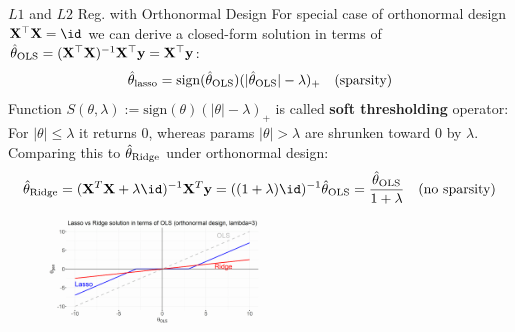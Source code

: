 \documentclass[11pt,compress,t,notes=noshow, xcolor=table]{beamer}
\begin{document}
\begin{vbframe}{$L1$ and $L2$ Reg. with Orthonormal Design}
\small For special case of orthonormal design $\Xmat^{\top}\Xmat=\id$ we can derive a closed-form solution in terms of $\hat{\theta}_{\text{OLS}}=(\mathbf{X}^{\top}\mathbf{X})^{-1}\mathbf{X}^{\top}\mathbf{y}=\mathbf{X}^{\top}\mathbf{y}$:
\vspace{-0.1cm}
$$\thetah_{\text{lasso}}=\text{sign}(\thetah_{\text{OLS}})(\vert \thetah_{\text{OLS}} \vert - \lambda)_{+}\quad(\text{sparsity})\vspace{-0.1cm}$$
Function $S(\theta,\lambda):=\text{sign}(\theta)(|\theta|-\lambda)_{+}$ is called \textbf{soft thresholding} operator: For $|\theta|\leq\lambda$ it returns $0$, whereas params $|\theta|>\lambda$ are shrunken toward $0$ by $\lambda$.\\
Comparing this to $\hat{\theta}_{\text{Ridge}}$ under orthonormal design: %
\vspace{-0.3cm}
$$\thetah_{\text{Ridge}}= ({\Xmat}^T \Xmat  + \lambda \id)^{-1} \Xmat^T\yv=((1+\lambda)\id)^{-1}\thetah_{\text{OLS}} = \frac{\thetah_{\text{OLS}}}{1+\lambda}\quad (\text{no sparsity})\vspace{-0.22cm}$$
\vspace{-0.16cm}
\begin{figure}
\includegraphics[width=0.5\textwidth]{figure/soft_thresholding.png}\\
\end{figure}

\end{vbframe}
\end{document}
